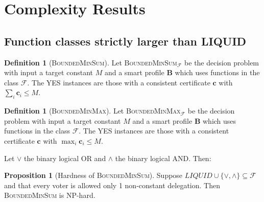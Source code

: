 \documentclass[11pt,a4paper, titlepage]{article}
\theoremstyle{definition}
\newtheorem{definition}[theorem]{Definition}
\newtheorem{proposition}[theorem]{Proposition}
\let\vec\mathbf
\begin{document}
\newpage



\section{Complexity Results}

\subsection{Function classes strictly larger than LIQUID}

\begin{definition}[\textsc{BoundedMinSum}]
    Let \textsc{BoundedMinSum}$_\mathcal{F}$ be the decision problem with input a target constant $M$ and a smart profile $\mathbf{B}$ which uses functions in the class $\mathcal{F}$. The YES instances are those with a consistent certificate  $\vec{c}$ with $\sum_i \vec{c}_i \leq M$. 
\end{definition}

\begin{definition}[\textsc{BoundedMinMax}]
    Let \textsc{BoundedMinMax}$_\mathcal{F}$ be the decision problem with input a target constant $M$ and a smart profile $\mathbf{B}$ which uses functions in the class $\mathcal{F}$. The YES instances are those with a consistent certificate  $\vec{c}$ with $\max_i \vec{c}_i \leq M$. 
\end{definition}

Let $\lor$ the binary logical OR and $\land$ the binary logical AND. Then:

\begin{proposition}[Hardness of \textsc{BoundedMinSum}]
    Suppose $\mathit{LIQUID} \cup \{\lor, \land\} \subseteq \mathcal{F}$ and that every voter is allowed only 1 non-constant delegation. Then \textsc{BoundedMinSum} is NP-hard.    
\end{proposition}
\end{document}
